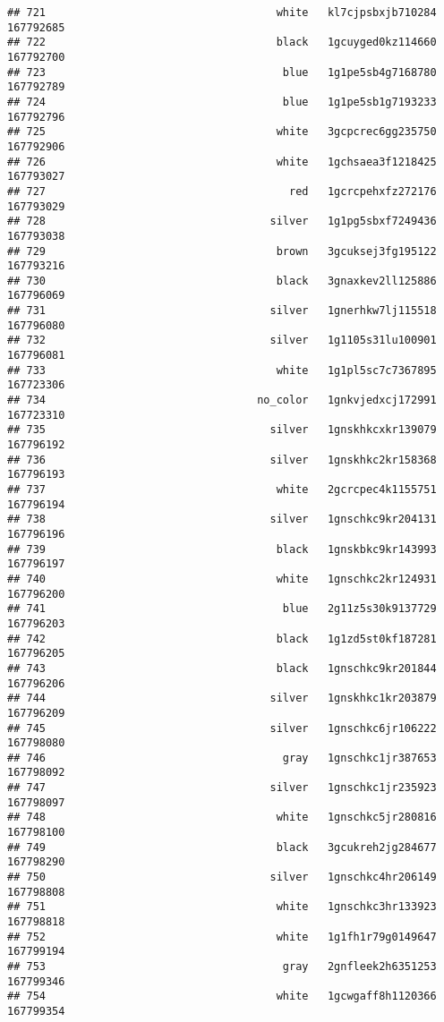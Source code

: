 \documentclass[
]{article}
\begin{document}
\begin{verbatim}
## 721                                    white   kl7cjpsbxjb710284 167792685
## 722                                    black   1gcuyged0kz114660 167792700
## 723                                     blue   1g1pe5sb4g7168780 167792789
## 724                                     blue   1g1pe5sb1g7193233 167792796
## 725                                    white   3gcpcrec6gg235750 167792906
## 726                                    white   1gchsaea3f1218425 167793027
## 727                                      red   1gcrcpehxfz272176 167793029
## 728                                   silver   1g1pg5sbxf7249436 167793038
## 729                                    brown   3gcuksej3fg195122 167793216
## 730                                    black   3gnaxkev2ll125886 167796069
## 731                                   silver   1gnerhkw7lj115518 167796080
## 732                                   silver   1g1105s31lu100901 167796081
## 733                                    white   1g1pl5sc7c7367895 167723306
## 734                                 no_color   1gnkvjedxcj172991 167723310
## 735                                   silver   1gnskhkcxkr139079 167796192
## 736                                   silver   1gnskhkc2kr158368 167796193
## 737                                    white   2gcrcpec4k1155751 167796194
## 738                                   silver   1gnschkc9kr204131 167796196
## 739                                    black   1gnskbkc9kr143993 167796197
## 740                                    white   1gnschkc2kr124931 167796200
## 741                                     blue   2g11z5s30k9137729 167796203
## 742                                    black   1g1zd5st0kf187281 167796205
## 743                                    black   1gnschkc9kr201844 167796206
## 744                                   silver   1gnskhkc1kr203879 167796209
## 745                                   silver   1gnschkc6jr106222 167798080
## 746                                     gray   1gnschkc1jr387653 167798092
## 747                                   silver   1gnschkc1jr235923 167798097
## 748                                    white   1gnschkc5jr280816 167798100
## 749                                    black   3gcukreh2jg284677 167798290
## 750                                   silver   1gnschkc4hr206149 167798808
## 751                                    white   1gnschkc3hr133923 167798818
## 752                                    white   1g1fh1r79g0149647 167799194
## 753                                     gray   2gnfleek2h6351253 167799346
## 754                                    white   1gcwgaff8h1120366 167799354

\end{verbatim}
\end{document}
